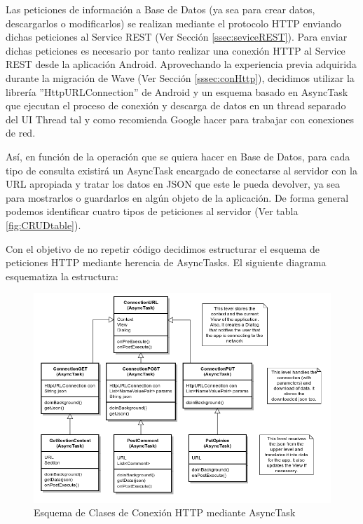 		Las peticiones de información a Base de Datos (ya sea para crear datos, descargarlos o modificarlos) se realizan mediante el protocolo HTTP enviando dichas peticiones al Service REST (Ver Sección \ref{ssec:seviceREST}). Para enviar dichas peticiones es necesario por tanto realizar una conexión HTTP al Service REST desde la aplicación Android. Aprovechando la experiencia previa adquirida durante la migración de Wave (Ver Sección \ref{sssec:conHttp}), decidimos utilizar la librería ''HttpURLConnection'' de Android y un esquema basado en AsyncTask que ejecutan el proceso de conexión y descarga de datos en un thread separado del UI Thread tal y como recomienda Google hacer para trabajar con conexiones de red\cite{ref:android_networking}.
		
		Así, en función de la operación que se quiera hacer en Base de Datos, para cada tipo de consulta existirá un AsyncTask encargado de conectarse al servidor con la URL apropiada y tratar los datos en JSON que este le pueda devolver, ya sea para mostrarlos o guardarlos en algún objeto de la aplicación. De forma general podemos identificar cuatro tipos de peticiones al servidor (Ver tabla \ref{fig:CRUDtable}).

Con el objetivo de no repetir código decidimos estructurar el esquema de peticiones HTTP mediante herencia de AsyncTasks. El siguiente diagrama esquematiza la estructura: 

	\begin{figure}[H]
	  \centering
	    \includegraphics[keepaspectratio, scale=0.6]{Media/Diagrams/classDiagramAsyncTask.png}
	  \caption{Esquema de Clases de Conexión HTTP mediante AsyncTask}
	  \label{fig:classConnectionTree}
	\end{figure}	
	
